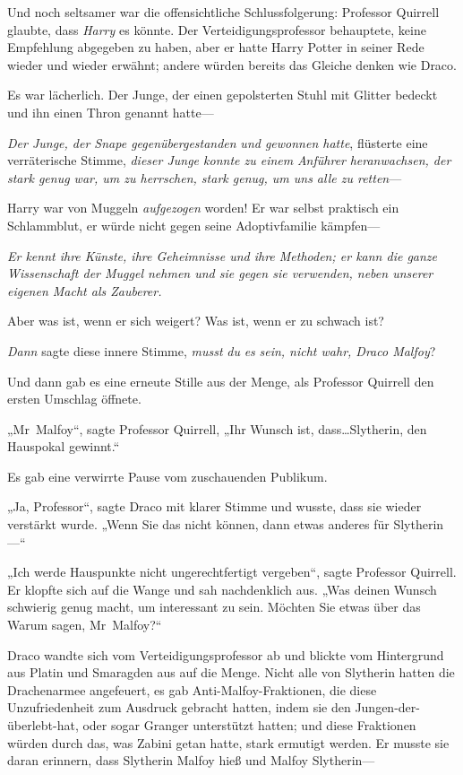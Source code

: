 {Und noch seltsamer war die offensichtliche Schlussfolgerung: Professor Quirrell glaubte, dass \emph{Harry} es könnte. Der Verteidigungsprofessor behauptete, keine Empfehlung abgegeben zu haben, aber er hatte Harry Potter in seiner Rede wieder und wieder erwähnt; andere würden bereits das Gleiche denken wie Draco.

Es war lächerlich. Der Junge, der einen gepolsterten Stuhl mit Glitter bedeckt und ihn einen Thron genannt hatte—

\emph{Der Junge, der Snape gegenübergestanden} \emph{und gewonnen hatte}, flüsterte eine verräterische Stimme, \emph{dieser Junge konnte zu einem} \emph{Anführer} \emph{heranwachsen, der stark genug war, um zu herrschen, stark genug, um uns alle zu retten}—

Harry war von Muggeln \emph{aufgezogen} worden! Er war selbst praktisch ein Schlammblut, er würde nicht gegen seine Adoptivfamilie kämpfen—

\emph{Er kennt ihre Künste, ihre Geheimnisse und ihre Methoden; er kann die ganze Wissenschaft der Muggel nehmen und sie gegen sie verwenden, neben unserer eigenen Macht als Zauberer.}

Aber was ist, wenn er sich weigert? Was ist, wenn er zu schwach ist?

\emph{Dann} sagte diese innere Stimme, \emph{musst} \emph{du} \emph{es} \emph{sein, nicht wahr, Draco Malfoy}?

Und dann gab es eine erneute Stille aus der Menge, als Professor Quirrell den ersten Umschlag öffnete.

„Mr~Malfoy“, sagte Professor Quirrell, „Ihr Wunsch ist, dass…Slytherin, den Hauspokal gewinnt.“

Es gab eine verwirrte Pause vom zuschauenden Publikum.

„Ja, Professor“, sagte Draco mit klarer Stimme und wusste, dass sie wieder verstärkt wurde. „Wenn Sie das nicht können, dann etwas anderes für Slytherin—“

„Ich werde Hauspunkte nicht ungerechtfertigt vergeben“, sagte Professor Quirrell. Er klopfte sich auf die Wange und sah nachdenklich aus. „Was deinen Wunsch schwierig genug macht, um interessant zu sein. Möchten Sie etwas über das Warum sagen, Mr~Malfoy?“

Draco wandte sich vom Verteidigungsprofessor ab und blickte vom Hintergrund aus Platin und Smaragden aus auf die Menge. Nicht alle von Slytherin hatten die Drachenarmee angefeuert, es gab Anti-Malfoy-Fraktionen, die diese Unzufriedenheit zum Ausdruck gebracht hatten, indem sie den Jungen-der-überlebt-hat, oder sogar Granger unterstützt hatten; und diese Fraktionen würden durch das, was Zabini getan hatte, stark ermutigt werden. Er musste sie daran erinnern, dass Slytherin Malfoy hieß und Malfoy Slytherin—

}
